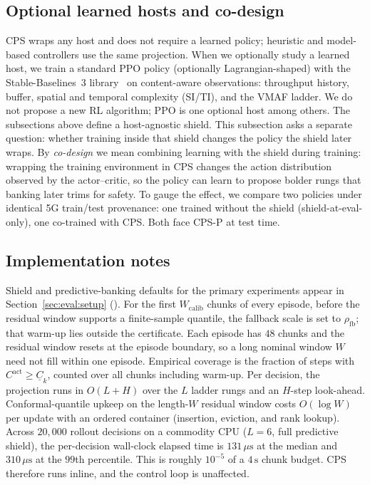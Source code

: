 \subsection{Optional learned hosts and co-design}
\label{sec:method:codesign}

CPS wraps any host and does not require a learned policy; heuristic and model-based controllers use the same projection.
When we optionally study a learned host, we train a standard PPO policy (optionally Lagrangian-shaped) with the Stable-Baselines~3 library~\cite{raffin2021sb3,schulman2017proximal} on content-aware observations: throughput history, buffer, spatial and temporal complexity (SI/TI), and the VMAF ladder.
We do not propose a new RL algorithm; PPO is one optional host among others.
The subsections above define a host-agnostic shield.
This subsection asks a separate question: whether training inside that shield changes the policy the shield later wraps.
By \emph{co-design} we mean combining learning with the shield during training: wrapping the training environment in CPS changes the action distribution observed by the actor--critic, so the policy can learn to propose bolder rungs that banking later trims for safety.
To gauge the effect, we compare two policies under identical \mbox{5G} train/test provenance: one trained without the shield (shield-at-eval-only), one co-trained with CPS. Both face CPS-P at test time.

\subsection{Implementation notes}
\label{sec:method:impl}

Shield and predictive-banking defaults for the primary experiments appear in Section~\ref{sec:eval:setup} ().
For the first \(W_{\mathrm{calib}}\) chunks of every episode, before the residual window supports a finite-sample quantile, the fallback scale is set to \(\rho_{\mathrm{fb}}\); that warm-up lies outside the certificate.
Each episode has \(48\) chunks and the residual window resets at the episode boundary, so a long nominal window \(W\) need not fill within one episode.
Empirical coverage is the fraction of steps with \(C^{\mathrm{act}}\ge\underline{C}_k\), counted over all chunks including warm-up.
Per decision, the projection runs in \(O(L{+}H)\) over the \(L\) ladder rungs and an \(H\)-step look-ahead. Conformal-quantile upkeep on the length-\(W\) residual window costs \(O(\log W)\) per update with an ordered container (insertion, eviction, and rank lookup).
Across \(20{,}000\) rollout decisions on a commodity CPU (\(L{=}6\), full predictive shield), the per-decision wall-clock elapsed time is \(131\,\mu\mathrm{s}\) at the median and \(310\,\mu\mathrm{s}\) at the \(99\)th percentile. This is roughly \(10^{-5}\) of a \(4\,\mathrm{s}\) chunk budget. CPS therefore runs inline, and the control loop is unaffected.

